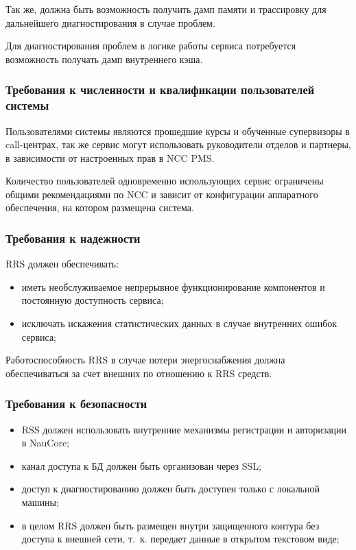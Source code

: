 Так же, должна быть возможность получить дамп памяти и трассировку для дальнейшего диагностирования в случае проблем.

Для диагностирования проблем в логике работы сервиса потребуется возможность получать дамп внутреннего кэша.

\subsubsection{Требования к численности и квалификации пользователей системы}

Пользователями системы являются прошедшие курсы и обученные супервизоры в call-центрах,
так же сервис могут использовать руководители отделов и партнеры,
в зависимости от настроенных прав в NCC PMS\@.

Количество пользователей одновременно использующих сервис ограничены
общими рекомендациями по NCC и зависит от конфигурации аппаратного обеспечения,
на котором размещена система.

\subsubsection{Требования к надежности}

RRS должен обеспечивать:
\begin{itemize}
    \item иметь необслуживаемое непрерывное функционирование компонентов и постоянную доступность сервиса;
    \item исключать искажения статистических данных в случае внутренних ошибок сервиса;
\end{itemize}

Работоспособность RRS в случае потери энергоснабжения должна обеспечиваться за счет внешних по отношению к RRS средств.

\subsubsection{Требования к безопасности}
\begin{itemize}
    \item RSS должен использовать внутренние механизмы регистрации и авторизации в NauCore;
    \item канал доступа к БД должен быть организован через SSL\@;
    \item доступ к диагностированию должен быть доступен только с локальной машины;
    \item в целом RRS должен быть размещен внутри защищенного контура без доступа к внешней сети, т.~к. передает данные в открытом текстовом виде;
\end{itemize}

